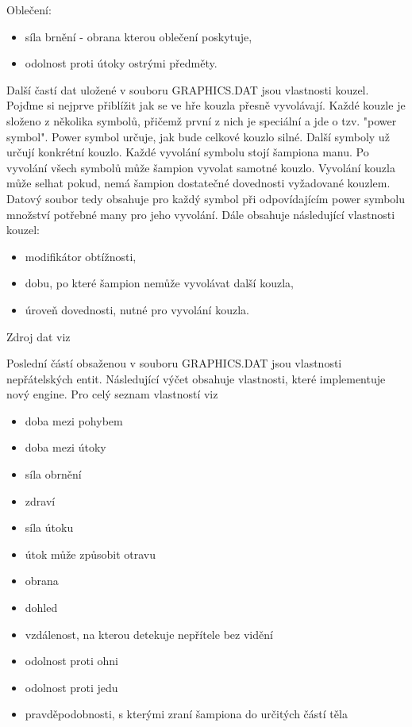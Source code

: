 Oblečení:
\begin{itemize}
\item síla brnění - obrana kterou oblečení poskytuje, 
\item odolnost proti útoky ostrými předměty. 
\end{itemize}

Další častí dat uložené v souboru GRAPHICS.DAT jsou vlastnosti kouzel. Pojďme si nejprve přiblížit
jak se ve hře kouzla přesně vyvolávají. Každé kouzle je složeno z několika symbolů, přičemž první 
z nich je speciální a jde o tzv. "power symbol". Power symbol určuje, jak bude celkové kouzlo silné.
Další symboly už určují konkrétní kouzlo. Každé vyvolání symbolu stojí šampiona manu. Po vyvolání 
všech symbolů může šampion vyvolat samotné kouzlo. Vyvolání kouzla může selhat pokud, nemá šampion 
dostatečné dovednosti vyžadované kouzlem. Datový soubor tedy obsahuje pro každý symbol při odpovídajícím
power symbolu množství potřebné many pro jeho vyvolání. Dále obsahuje následující vlastnosti kouzel:
\begin{itemize}
\item modifikátor obtížnosti,
\item dobu, po které šampion nemůže vyvolávat další kouzla,
\item úroveň dovednosti, nutné pro vyvolání kouzla.
\end{itemize}
Zdroj dat viz 

Poslední částí obsaženou v souboru GRAPHICS.DAT jsou vlastnosti nepřátelských entit.
Následující výčet obsahuje vlastnosti, které implementuje nový engine. Pro celý
seznam vlastností viz 
\begin{itemize}
\item doba mezi pohybem 
\item doba mezi útoky
\item síla obrnění
\item zdraví
\item síla útoku
\item útok může způsobit otravu
\item obrana 
\item dohled 
\item vzdálenost, na kterou detekuje nepřítele bez vidění 
\item odolnost proti ohni
\item odolnost proti jedu
\item pravděpodobnosti, s kterými zraní šampiona do určitých částí těla
\end{itemize}


